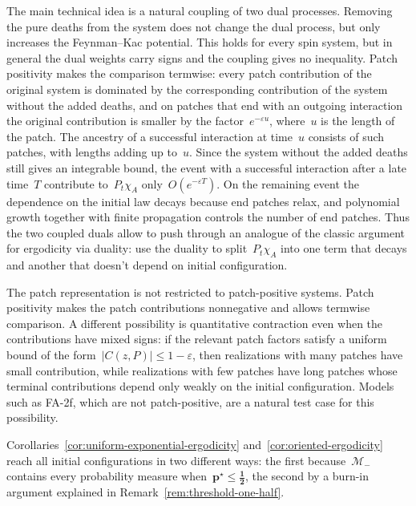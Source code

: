 \documentclass[EJP,preprint,NODS,nobera]{ejpecp}
\newcommand{\abs}[1]{\left|#1\right|}
\newcommand{\mb}[1]{\mathbf{#1}}
\newcommand{\mbs}[1]{\boldsymbol{#1}}
\begin{document}
The main technical idea is a natural coupling of two dual processes.
Removing the pure deaths from the system does not change the dual
process, but only increases the
Feynman--Kac potential. This holds for every spin system, but in general the
dual weights carry signs and the coupling gives no inequality. Patch
positivity makes the comparison termwise:
every patch contribution of the original system is dominated by the
corresponding contribution of the system without the added deaths, and on
patches that end with an outgoing interaction the original contribution is
smaller by the factor~$e^{-\varepsilon u}$, where~$u$ is the length of the
patch. The ancestry of a successful interaction at time~$u$ consists of such
patches, with lengths adding up to~$u$. Since the system without the added
deaths still gives an integrable bound, the event with a successful interaction after a late time~$T$ contribute to~$P_t\chi_A$
only~$O(e^{-\varepsilon T})$. On the remaining event the dependence on the
initial law decays because end patches relax, and polynomial growth together
with finite propagation controls the number of end patches. Thus the two
coupled duals allow to push through an analogue of the classic argument for ergodicity via duality: use the duality to split~$P_t\chi_A$ into one term that decays and another that doesn't depend on initial configuration.

The patch representation is not restricted to patch-positive systems. Patch
positivity makes the patch contributions nonnegative and allows termwise
comparison. A different possibility is quantitative contraction even when the
contributions have mixed signs: if the relevant patch factors satisfy a
uniform bound of the form~$\abs{C(z,P)}\leq1-\varepsilon$, then realizations
with many patches have small contribution, while realizations with few
patches have long patches whose terminal contributions depend only weakly on
the initial configuration. Models such as FA-2f, which are not
patch-positive, are a natural test case for this possibility.

Corollaries~\ref{cor:uniform-exponential-ergodicity}
and~\ref{cor:oriented-ergodicity} reach all initial configurations in two
different ways: the first because~$\mathcal M_-$ contains every probability
measure when~$\mb p^\star\leq\mbs{\tfrac12}$, the second by a burn-in
argument explained in Remark~\ref{rem:threshold-one-half}.
\end{document}
